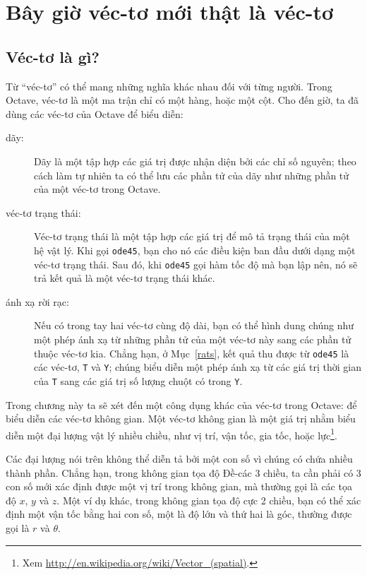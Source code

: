 \documentclass[12pt]{book}
\begin{document}
\chapter{Bây giờ véc-tơ mới thật là véc-tơ}

\section{Véc-tơ là gì?}

Từ ``véc-tơ'' có thể mang những nghĩa khác nhau đối với từng người. Trong 
Octave, véc-tơ là một ma trận chỉ có một hàng, hoặc một cột. Cho đến giờ,
ta đã dùng các véc-tơ của Octave để biểu diễn:

\begin{description}

\item[dãy:] Dãy là một tập hợp các giá trị được nhận diện bởi các chỉ số 
nguyên; theo cách làm tự nhiên ta có thể lưu các phần tử của dãy như những 
phần tử của một véc-tơ trong Octave.

\item[véc-tơ trạng thái:] Véc-tơ trạng thái là một tập hợp các giá trị để mô tả 
trạng thái của một hệ vật lý. Khi gọi {\tt ode45}, bạn cho nó các điều kiện 
ban đầu dưới dạng một véc-tơ trạng thái. Sau đó, khi {\tt ode45} gọi hàm 
tốc độ mà bạn lập nên, nó sẽ trả kết quả là một véc-tơ trạng thái khác.

\item[ánh xạ rời rạc:] Nếu có trong tay hai véc-tơ cùng độ dài, bạn có thể hình 
dung chúng như một phép ánh xạ từ những phần tử của một véc-tơ này sang 
các phần tử thuộc véc-tơ kia. Chẳng hạn, ở Mục~\ref{rats}, kết quả thu được 
từ  {\tt ode45} là các véc-tơ, {\tt T} và {\tt Y}; chúng biểu diễn một phép 
ánh xạ từ các giá trị thời gian của {\tt T} sang các giá trị số lượng chuột có 
trong {\tt Y}.

\end{description}

Trong chương này ta sẽ xét đến một công dụng khác của véc-tơ trong Octave:
để biểu diễn các véc-tơ không gian. Một véc-tơ không gian là một giá trị nhằm 
biểu diễn một đại lượng vật lý nhiều chiều, như vị trí, vận tốc, gia tốc, hoặc 
lực\footnote{Xem
\url{http://en.wikipedia.org/wiki/Vector_(spatial)}.}.

Các đại lượng nói trên không thể diễn tả bởi một con số vì chúng có chứa 
nhiều thành phần. Chẳng hạn, trong không gian tọa độ Đề-các 3 chiều, ta cần 
phải có 3 con số mới xác định được một vị trí trong không gian, mà thường 
gọi là các tọa độ $x$, $y$ và $z$.  Một ví dụ khác, trong không gian tọa độ 
cực 2 chiều, bạn có thể xác định một vận tốc bằng hai con số, một là độ lớn 
và thứ hai là góc, thường được gọi là $r$ và $\theta$.
\end{document}

